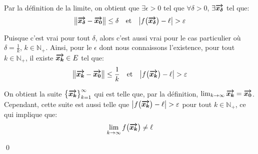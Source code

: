 \documentclass[a4paper]{article}
\begin{document}
{{        Par la définition de la limite, on obtient que $\exists \epsilon > 0$ tel que $\forall \delta > 0$, $\exists \bm{\protect\overrightarrow{x_\delta}}$ tel que:
        \[\left\|\bvec{x_{\delta}} - \bvec{x_0}\right\| \leq \delta \mathspace \text{et} \mathspace \left|f\left(\bvec{x_{\delta}}\right) - \ell\right| > \epsilon\]

        Puisque c'est vrai pour tout $\delta$, alors c'est aussi vrai pour le cas particulier où $\delta = \frac{1}{k}$, $k \in \mathbb{N}_+$. Ainsi, pour le $\epsilon$ dont nous connaissons l'existence, pour tout $k \in \mathbb{N}_+$, il existe $\bm{\protect\overrightarrow{x_k}} \in E$ tel que:
        \[\left\|\bvec{x_k} - \bvec{x_0}\right\| \leq \frac{1}{k} \mathspace \text{et} \mathspace \left|f\left(\bvec{x_k}\right) - \ell\right| > \epsilon\]

        On obtient la suite $\left\{\bvec{x_k}\right\}_{k=1}^{\infty}$ qui est telle que, par la définition, $\lim_{k \to \infty} \bm{\protect\overrightarrow{x_k}} = \bm{\protect\overrightarrow{x_0}}$. Cependant, cette suite est aussi telle que $\left|f\left(\bvec{x_k}\right) - \ell\right| > \epsilon$ pour tout $k \in \mathbb{N}_+$, ce qui implique que:
        \[\lim_{k \to \infty} f\left(\bvec{x_k}\right) \neq \ell\]

        \qed
    }
}
\end{document}
